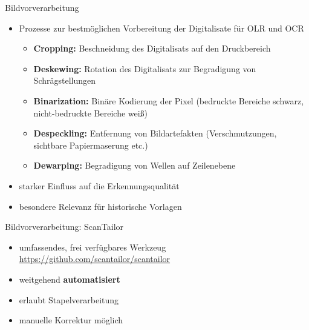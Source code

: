 \documentclass{bbawslides}
\begin{document}
\begin{bbawslide}{Bildvorverarbeitung}
  \vspace*{7mm}%
  \centerslidestrue%
  \begin{itemize}
    \item Prozesse zur bestmöglichen Vorbereitung der Digitalisate für OLR und OCR
    \begin{itemize}\small
      \item \textbf{Cropping:} Beschneidung des Digitalisats auf den Druckbereich
      \item \textbf{Deskewing:} Rotation des Digitalisats zur Begradigung von Schrägstellungen
      \item \textbf{Binarization:} Binäre Kodierung der Pixel (bedruckte Bereiche schwarz, nicht-bedruckte Bereiche weiß)
      \item \textbf{Despeckling:} Entfernung von Bildartefakten (Verschmutzungen, sichtbare Papiermaserung etc.)
      \item \textbf{Dewarping:} Begradigung von Wellen auf Zeilenebene
    \end{itemize}
    \item starker Einfluss auf die Erkennungsqualität
    \item besondere Relevanz für historische Vorlagen
  \end{itemize}
\end{bbawslide}

\begin{bbawslide}{Bildvorverarbeitung: ScanTailor}
  \vspace*{7mm}%
  \centerslidestrue%
  \begin{itemize}
    \item umfassendes, frei verfügbares Werkzeug\\
          \url{https://github.com/scantailor/scantailor}
    \item weitgehend \textbf{automatisiert}
    \item erlaubt Stapelverarbeitung
    \item manuelle Korrektur möglich
  \end{itemize}
\end{bbawslide}
\end{document}
